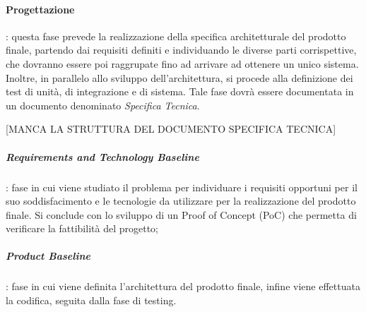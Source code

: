 \paragraph{Progettazione}: questa fase prevede la realizzazione della specifica architetturale del prodotto finale, partendo dai requisiti definiti e individuando le diverse parti corrispettive, che dovranno essere poi raggrupate fino ad arrivare ad ottenere un unico sistema. \newline
Inoltre, in parallelo allo sviluppo dell'architettura, si procede alla definizione dei test di unità, di integrazione e di sistema. \newline
Tale fase dovrà essere documentata in un documento denominato \textit{Specifica Tecnica}.

[MANCA LA STRUTTURA DEL DOCUMENTO SPECIFICA TECNICA]

\subparagraph{Requirements and Technology Baseline}: fase in cui viene studiato il problema per individuare i requisiti opportuni per il suo soddisfacimento e le tecnologie da utilizzare per la realizzazione del prodotto finale. \newline
Si conclude con lo sviluppo di un Proof of Concept (PoC) che permetta di verificare la fattibilità del progetto;

\subparagraph{Product Baseline}: fase in cui viene definita l'architettura del prodotto finale, infine viene effettuata la codifica, seguita dalla fase di testing.


